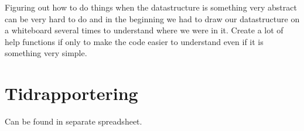 \documentclass[12pt,a4paper]{article}
\begin{document}
Figuring out how to do things when the datastructure is something very abstract can be very hard to do and in the beginning we had to draw our datastructure on a whiteboard several times to understand where we were in it.
Create a lot of help functions if only to make the code easier to understand even if it is something very simple.



\section{Tidrapportering}

Can be found in separate spreadsheet.

\end{document}
